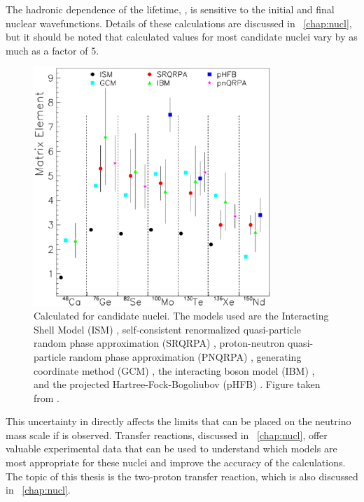 The hadronic dependence of the lifetime, \NME, is sensitive to the initial and final nuclear wavefunctions.  Details of these calculations are discussed in {\chap}~\ref{chap:nucl}, but it should be noted that calculated \NME values for most candidate nuclei vary by as much as a factor of 5.
\begin{figure}[htp]
\centering
\includegraphics[width=0.8\textwidth]{figures/differentNME.eps}
\caption[Uncertainty in current calculated values of \NME.]{Calculated \NME for candidate \zvbb nuclei.  The models used are the Interacting Shell Model (ISM) \citep{ISM}, self-consistent renormalized quasi-particle random phase approximation (SRQRPA) \citep{FaesslerReview}, proton-neutron quasi-particle random phase approximation (PNQRPA) \citep{pnQRPA_Suhonen}, generating coordinate method (GCM) \citep{GCM}, the interacting boson model (IBM) \citep{IBM_Iachello}, and the projected Hartree-Fock-Bogoliubov (pHFB) \citep{pHFB}.  Figure taken from \citep{zvbbReviewSchwingenheuer}.}
\label{fig:differentNME}
\end{figure}  
This uncertainty in \NME directly affects the limits that can be placed on the neutrino mass scale if \zvbb is observed.  Transfer reactions, discussed in {\chap}~\ref{chap:nucl}, offer valuable experimental data that can be used to understand which models are most appropriate for these nuclei and improve the accuracy of the calculations.  The topic of this thesis is the two-proton transfer reaction, which is also discussed in {\chap}~\ref{chap:nucl}.

